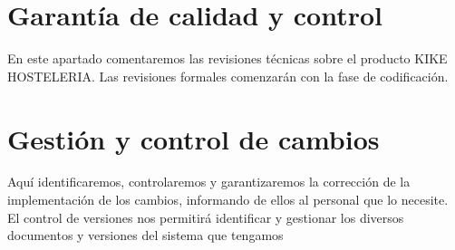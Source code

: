 \documentclass[spanish,a4paper,12pt]{report}	%
\begin{document}
	\section{Garantía de calidad y control} 
En este apartado comentaremos las revisiones técnicas sobre el producto KIKE HOSTELERIA. Las revisiones formales comenzarán con la fase de codificación.

	\section{Gestión y control de cambios}
Aquí identificaremos, controlaremos y garantizaremos la corrección de la implementación de los cambios, informando de ellos al personal que lo necesite.
El control de versiones nos permitirá identificar y gestionar los diversos documentos y versiones del sistema que tengamos





\newpage
\mbox{}
\thispagestyle{empty}						%
\newpage
\end{document}
